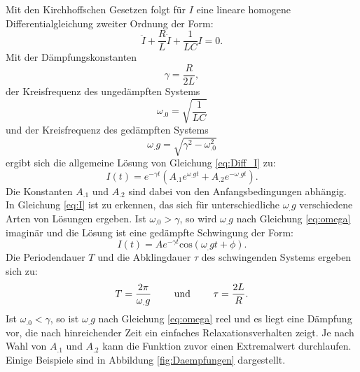 \noindent Mit den Kirchhoffschen Gesetzen folgt für $I$ eine lineare homogene Differentialgleichung zweiter Ordnung der Form:
\begin{equation}
\ddot{I} + \frac{R}{L} \dot{I} + \frac{1}{LC}I = 0\text{.} \label{eq:Diff_I}
\end{equation}
Mit der Dämpfungskonstanten
\[
\gamma=\frac{R}{2L},
\]
der Kreisfrequenz des ungedämpften Systems
\[
\omega_.0 = \sqrt{\frac{1}{LC}}
\]
und der Kreisfrequenz des gedämpften Systems
\begin{equation}
\omega_.g=\sqrt{\gamma^2-\omega_.0^2}\label{eq:omega}
\end{equation}
ergibt sich die allgemeine Lösung von Gleichung \eqref{eq:Diff_I} zu:
\begin{equation}
I(t) = e^{-\gamma t}\left(A_.1e^{\omega_.g t}+A_.2e^{-\omega_.g t}\right)\text{.} \label{eq:I}
\end{equation}
Die Konstanten $A_.1$ und $A_.2$ sind dabei von den Anfangsbedingungen abhängig.
In Gleichung \eqref{eq:I} ist zu erkennen, das sich für unterschiedliche $\omega_.g$ verschiedene Arten von Lösungen ergeben.\newline
Ist $\omega_.0>\gamma$, so wird $\omega_.g$ nach Gleichung \eqref{eq:omega} imaginär und die Lösung ist eine gedämpfte Schwingung der Form:
\begin{equation}
I(t) = A e^{-\gamma t} \mathrm{cos}(\omega_.g t + \phi)\text{.} \label{eq:I2}
\end{equation}
Die Periodendauer $T$ und die Abklingdauer $\tau$ des schwingenden Systems ergeben sich zu:
\[
T = \frac{2\pi}{\omega_.g} \text{\hspace{2em} und \hspace{2em}} \tau = \frac{2L}{R}\text{.}
\]
Ist $\omega_.0<\gamma$, so ist $\omega_.g$ nach Gleichung \eqref{eq:omega} reel und es liegt eine Dämpfung vor, die nach hinreichender Zeit ein einfaches Relaxationsverhalten zeigt. Je nach Wahl von $A_.1$ und $A_.2$ kann die Funktion zuvor einen Extremalwert durchlaufen. Einige Beispiele sind in Abbildung \ref{fig:Daempfungen} dargestellt.

